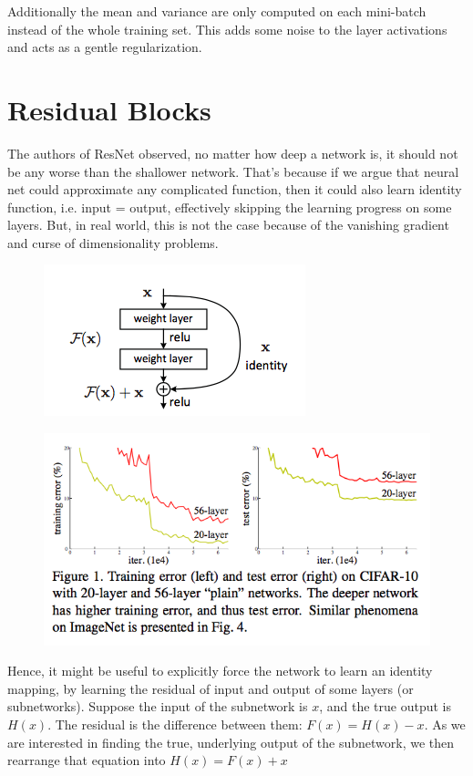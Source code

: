 \documentclass{scrartcl}
\begin{document}
Additionally the mean and variance are only computed on each mini-batch instead of the whole training set. This adds some noise to the layer activations and acts as a gentle regularization.

\section{Residual Blocks \cite{residual-net}}
The authors of ResNet observed, no matter how deep a network is, it should not be any worse than the shallower network. That’s because if we argue that neural net could approximate any complicated function, then it could also learn identity function, i.e. input = output, effectively skipping the learning progress on some layers. But, in real world, this is not the case because of the vanishing gradient and curse of dimensionality problems.

\begin{figure}
	\centering
		\includegraphics[scale=0.7]{img/residual_block}
	\label{fig:degradation_problem}
\end{figure}

\begin{figure}
	\centering
		\includegraphics[scale=0.7]{img/degradation_problem}
	\label{fig:degradation_problem}
\end{figure}

Hence, it might be useful to explicitly force the network to learn an identity mapping, by learning the residual of input and output of some layers (or subnetworks). Suppose the input of the subnetwork is 
$x$, and the true output is $H(x)$. The residual is the difference between them: $F(x) = H(x) - x$. As we are interested in finding the true, underlying output of the subnetwork, we then rearrange that equation into $H(x) = F(x) + x$
\end{document}
